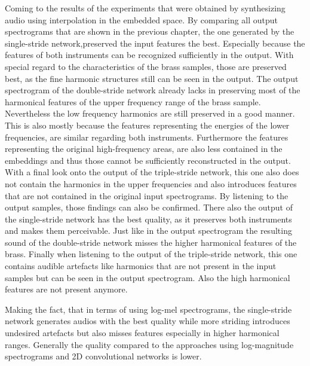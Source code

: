 Coming to the results of the experiments that were obtained by synthesizing audio using interpolation in the embedded space. By comparing all output spectrograms that are shown in the previous chapter, the one generated by the single-stride network,preserved the input features the best. Especially because the features of both instruments can be recognized sufficiently in the output. With special regard to the characteristics of the brass samples, those are preserved best, as the fine harmonic structures still can be seen in the output. The output spectrogram of the double-stride network already lacks in preserving most of the harmonical features of the upper frequency range of the brass sample. Nevertheless the low frequency harmonics are still preserved in a good manner.
This is also mostly because the features representing the energies of the lower frequencies, are similar regarding both instruments. 
Furthermore the features representing the original high-frequency areas, are also less contained in the embeddings and thus those cannot be sufficiently reconstructed in the output. With a final look onto the output of the triple-stride network, this one also does not contain the harmonics in the upper frequencies and also introduces features that are not contained in the original input spectrograms. By listening to the output samples, those findings can also be confirmed. There also the output of the single-stride network has the best quality, as it preserves both instruments and makes them perceivable. Just like in the output spectrogram the resulting sound of the double-stride network misses the higher harmonical features of the brass. Finally when listening to the output of the triple-stride network, this one contains audible artefacts like harmonics that are not present in the input samples but can be seen in the output spectrogram. Also the high harmonical features are not present anymore.

Making the fact, that in terms of using log-mel spectrograms, the single-stride network generates audios with the best quality while more striding introduces undesired artefacts but also misses features especially in higher harmonical ranges. Generally the quality compared to the approaches using log-magnitude spectrograms and 2D convolutional networks is lower. 

\newpage

